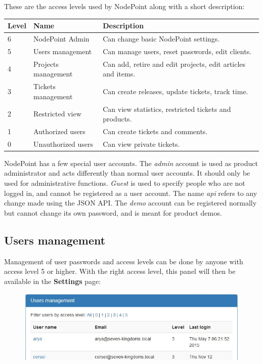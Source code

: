 \documentclass[11pt]{article}
\begin{document}
These are the access levels used by NodePoint along with a short description:

\def\arraystretch{1.3} 
\begin{tabular}{ |p{15mm}|p{50mm}|p{100mm}| } 
\hline
\textbf{Level} & \textbf{Name} & \textbf{Description}\\
\hline
6 & NodePoint Admin & Can change basic NodePoint settings.\\
5 & Users management & Can manage users, reset passwords, edit clients.\\
4 & Projects management & Can add, retire and edit projects, edit articles and items.\\
3 & Tickets management & Can create releases, update tickets, track time.\\
2 & Restricted view & Can view statistics, restricted tickets and products.\\
1 & Authorized users & Can create tickets and comments.\\
0 & Unauthorized users & Can view private tickets.\\
\hline
\end{tabular}

NodePoint has a few special user accounts. The \textit{admin} account is used as product administrator and acts differently than normal user accounts. It should only be used for administrative functions. \textit{Guest} is used to specify people who are not logged in, and cannot be registered as a user account. The name \textit{api} refers to any change made using the JSON API. The \textit{demo} account can be registered normally but cannot change its own password, and is meant for product demos.

\subsection{Users management}
Management of user passwords and access levels can be done by anyone with access level 5 or higher. With the right access level, this panel will then be available in the \textbf{Settings} page:

\begin{figure}[h]
\includegraphics{userman.jpg}
\end{figure}
\end{document}
